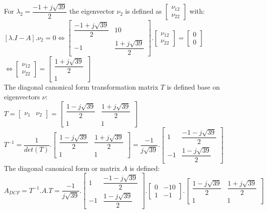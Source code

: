 \documentclass[14pt,a4paper]{article}
\begin{document}
\begin{enumerate}
		For $\lambda_2 = \dfrac{-1+j\sqrt{39}}{2}$ the eigenvector $\nu_2$ is defined as $\begin{bmatrix}\nu_{12}\\ \nu_{22} \end{bmatrix}$ with: \\
		$[\lambda .I - A].\nu_2 = 0 \Leftrightarrow \begin{bmatrix} \dfrac{-1+j\sqrt{39}}{2} & 10 \\ -1 & \dfrac{1+j\sqrt{39}}{2} \end{bmatrix} .\begin{bmatrix}\nu_{12}\\ \nu_{22} \end{bmatrix} = \begin{bmatrix} 0\\0 \end{bmatrix} $ \\
		$ \Leftrightarrow \begin{bmatrix} \nu_{12} \\\nu_{22}	\end{bmatrix} = \begin{bmatrix} \dfrac{1+j\sqrt{39}}{2}  \\ 1	\end{bmatrix}$ \\
		
		The diagonal canonical form transformation matrix $T$ is defined base on eigenvectors $\nu$: \\
		$T = \begin{bmatrix} \nu_1 & \nu_2	\end{bmatrix} = \begin{bmatrix} \dfrac{1-j\sqrt{39}}{2} & \dfrac{1+j\sqrt{39}}{2} \\ 1&1 \end{bmatrix} $\\
		
		$T^{-1} = \dfrac{1}{det(T)}.\begin{bmatrix} \dfrac{1-j\sqrt{39}}{2} & \dfrac{1+j\sqrt{39}}{2} \\ 1&1 \end{bmatrix} = \dfrac{-1}{j\sqrt{39}}.\begin{bmatrix} 1&\dfrac{-1-j\sqrt{39}}{2} \\ -1 & \dfrac{1-j\sqrt{39}}{2} \end{bmatrix} $\\
		
		The diagonal canonical form or matrix $A$ is defined: \\
		$A_{DCF} = T^{-1}.A.T = \dfrac{-1}{j\sqrt{39}}.\begin{bmatrix} 1&\dfrac{-1-j\sqrt{39}}{2} \\ -1 & \dfrac{1-j\sqrt{39}}{2} \end{bmatrix} .\begin{bmatrix} 0&-10 \\ 1&-1 \end{bmatrix} .\begin{bmatrix} \dfrac{1-j\sqrt{39}}{2} & \dfrac{1+j\sqrt{39}}{2} \\ 1&1 \end{bmatrix} $ \\
		

\end{enumerate}
\end{document}
